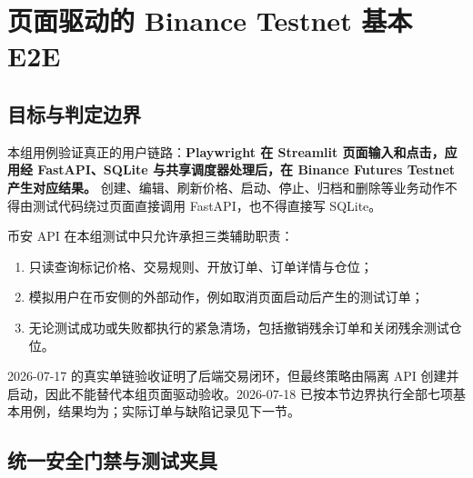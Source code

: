 \section{页面驱动的 Binance Testnet 基本 E2E}

\subsection{目标与判定边界}

本组用例验证真正的用户链路：\textbf{Playwright 在 Streamlit 页面输入和点击，应用经 FastAPI、SQLite 与共享调度器处理后，在 Binance Futures Testnet 产生对应结果。} 创建、编辑、刷新价格、启动、停止、归档和删除等业务动作不得由测试代码绕过页面直接调用 FastAPI，也不得直接写 SQLite。

币安 API 在本组测试中只允许承担三类辅助职责：

\begin{enumerate}
  \item 只读查询标记价格、交易规则、开放订单、订单详情与仓位；
  \item 模拟用户在币安侧的外部动作，例如取消页面启动后产生的测试订单；
  \item 无论测试成功或失败都执行的紧急清场，包括撤销残余订单和关闭残余测试仓位。
\end{enumerate}

2026-07-17 的真实单链验收证明了后端交易闭环，但最终策略由隔离 API 创建并启动，因此不能替代本组页面驱动验收。2026-07-18 已按本节边界执行全部七项基本用例，结果均为\StatusPass；实际订单与缺陷记录见下一节。

\subsection{统一安全门禁与测试夹具}

